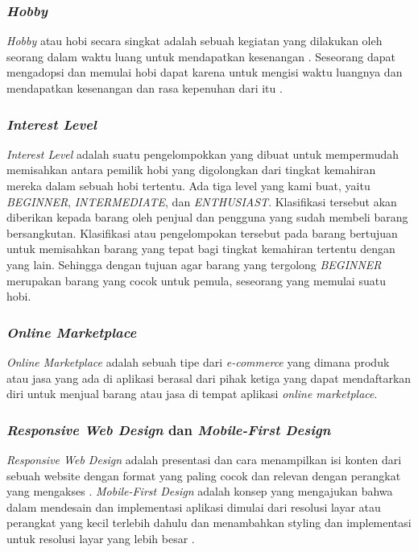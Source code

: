 \documentclass[a4paper]{article}
\newcommand{\subsubbab}[1]{%
    \subsubsection{#1}%
}
\begin{document}
\subsubbab{\textit{Hobby}}
\textit{Hobby} atau hobi secara singkat adalah sebuah kegiatan yang dilakukan oleh seorang dalam waktu luang untuk mendapatkan kesenangan \autocite{Dict_hobi}. Seseorang dapat mengadopsi dan memulai hobi dapat karena untuk mengisi waktu luangnya dan mendapatkan kesenangan dan rasa kepenuhan dari itu \autocite{linkedin_hobi}.

\subsubbab{\textit{Interest Level}}
\textit{Interest Level} adalah suatu pengelompokkan yang dibuat untuk mempermudah memisahkan antara pemilik hobi yang digolongkan dari tingkat kemahiran mereka dalam sebuah hobi tertentu. Ada tiga level yang kami buat, yaitu \textit{BEGINNER}, \textit{INTERMEDIATE}, dan \textit{ENTHUSIAST}. Klasifikasi tersebut akan diberikan kepada barang oleh penjual dan pengguna yang sudah membeli barang bersangkutan. Klasifikasi atau pengelompokan tersebut pada barang bertujuan untuk memisahkan barang yang tepat bagi tingkat kemahiran tertentu dengan yang lain. Sehingga dengan tujuan agar barang yang tergolong \textit{BEGINNER} merupakan barang yang cocok untuk pemula, seseorang yang memulai suatu hobi.

\subsubbab{\textit{Online Marketplace}}
\textit{Online Marketplace} adalah sebuah tipe dari \textit{e-commerce} yang dimana  produk atau jasa yang ada di aplikasi berasal dari pihak ketiga yang dapat mendaftarkan diri untuk menjual barang atau jasa di tempat aplikasi \textit{online marketplace}. \autocite{pediaa_marketplace}

\subsubbab{\textit{Responsive Web Design} dan \textit{Mobile-First Design}}
\textit{Responsive Web Design} adalah presentasi dan cara menampilkan isi konten dari sebuah website dengan format yang paling cocok dan relevan dengan perangkat yang mengakses \autocite{Frain_2022}. \textit{Mobile-First Design} adalah konsep yang mengajukan bahwa dalam mendesain dan implementasi aplikasi dimulai dari resolusi layar atau perangkat yang kecil terlebih dahulu dan menambahkan styling dan implementasi untuk resolusi layar yang lebih besar \autocite{Ward_2017}.
\end{document}
